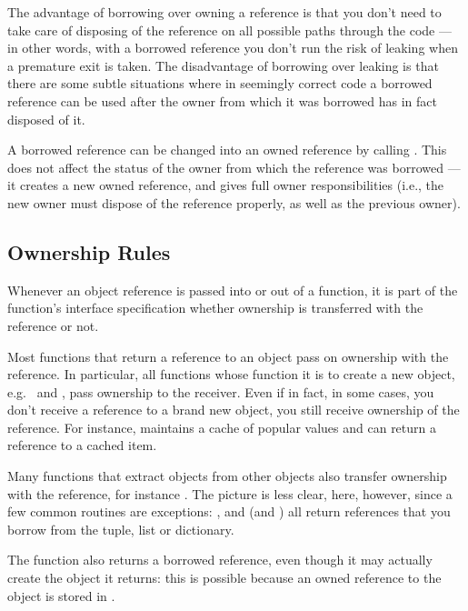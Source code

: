 The advantage of borrowing over owning a reference is that you don't
need to take care of disposing of the reference on all possible paths
through the code --- in other words, with a borrowed reference you
don't run the risk of leaking when a premature exit is taken.  The
disadvantage of borrowing over leaking is that there are some subtle
situations where in seemingly correct code a borrowed reference can be
used after the owner from which it was borrowed has in fact disposed
of it.

A borrowed reference can be changed into an owned reference by calling
.  This does not affect the status of the owner from
which the reference was borrowed --- it creates a new owned reference,
and gives full owner responsibilities (i.e., the new owner must
dispose of the reference properly, as well as the previous owner).

\subsection{Ownership Rules}

Whenever an object reference is passed into or out of a function, it
is part of the function's interface specification whether ownership is
transferred with the reference or not.

Most functions that return a reference to an object pass on ownership
with the reference.  In particular, all functions whose function it is
to create a new object, e.g.\  and
, pass ownership to the receiver.  Even if in
fact, in some cases, you don't receive a reference to a brand new
object, you still receive ownership of the reference.  For instance,
 maintains a cache of popular values and can
return a reference to a cached item.

Many functions that extract objects from other objects also transfer
ownership with the reference, for instance
.  The picture is less clear, here,
however, since a few common routines are exceptions:
,  and
 (and ) all return
references that you borrow from the tuple, list or dictionary.

The function  also returns a borrowed
reference, even though it may actually create the object it returns:
this is possible because an owned reference to the object is stored in
.

